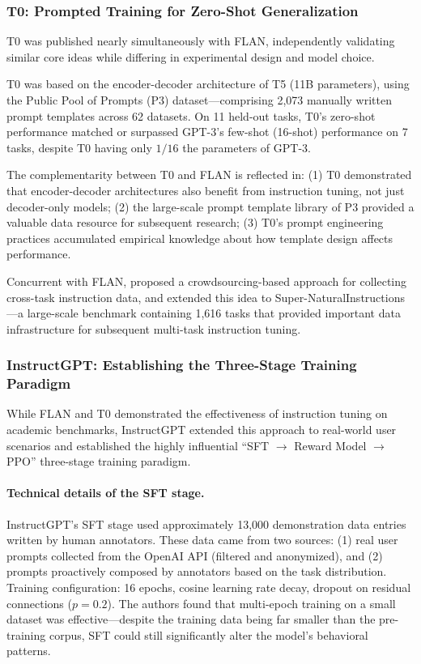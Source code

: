 \subsubsection{T0: Prompted Training for Zero-Shot Generalization}
\label{sec:t1-t0}

T0 was published nearly simultaneously with FLAN, independently validating similar core ideas
while differing in experimental design and model choice.

T0 was based on the encoder-decoder architecture of T5 (11B parameters),
using the Public Pool of Prompts (P3) dataset---comprising
2,073 manually written prompt templates across 62 datasets.
On 11 held-out tasks, T0's zero-shot performance
matched or surpassed GPT-3's few-shot (16-shot) performance on 7 tasks,
despite T0 having only $1/16$ the parameters of GPT-3.

The complementarity between T0 and FLAN is reflected in:
(1) T0 demonstrated that encoder-decoder architectures also benefit from instruction tuning, not just decoder-only models;
(2) the large-scale prompt template library of P3 provided a valuable data resource for subsequent research;
(3) T0's prompt engineering practices accumulated empirical knowledge about how template design affects performance.

Concurrent with FLAN, \citet{mishra2021crossfit} proposed a crowdsourcing-based approach
for collecting cross-task instruction data,
and \citet{wang2022supernaturalinstructions} extended this idea to
Super-Natural\-Instructions---a large-scale benchmark containing 1,616 tasks
that provided important data infrastructure for subsequent multi-task instruction tuning.


\subsubsection{InstructGPT: Establishing the Three-Stage Training Paradigm}
\label{sec:t1-instructgpt}

While FLAN and T0 demonstrated the effectiveness of instruction tuning on academic benchmarks,
InstructGPT extended this approach to real-world user scenarios
and established the highly influential ``SFT $\rightarrow$ Reward Model $\rightarrow$ PPO'' three-stage training paradigm.

\paragraph{Technical details of the SFT stage.}
InstructGPT's SFT stage used approximately 13,000 demonstration data entries written by human annotators.
These data came from two sources:
(1) real user prompts collected from the OpenAI API (filtered and anonymized), and
(2) prompts proactively composed by annotators based on the task distribution.
Training configuration: 16 epochs, cosine learning rate decay, dropout on residual connections ($p=0.2$).
The authors found that multi-epoch training on a small dataset was effective---despite the training data being far smaller than the pre-training corpus,
SFT could still significantly alter the model's behavioral patterns.

